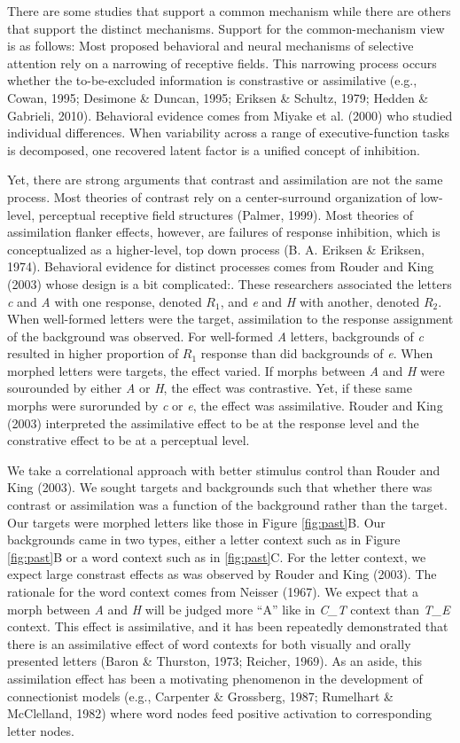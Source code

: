 \documentclass[english,floatsintext,man]{apa6}
\begin{document}
There are some studies that support a common mechanism while there are
others that support the distinct mechanisms. Support for the
common-mechanism view is as follows: Most proposed behavioral and neural
mechanisms of selective attention rely on a narrowing of receptive
fields. This narrowing process occurs whether the to-be-excluded
information is constrastive or assimilative (e.g., Cowan, 1995; Desimone
\& Duncan, 1995; Eriksen \& Schultz, 1979; Hedden \& Gabrieli, 2010).
Behavioral evidence comes from Miyake et al. (2000) who studied
individual differences. When variability across a range of
executive-function tasks is decomposed, one recovered latent factor is a
unified concept of inhibition.

Yet, there are strong arguments that contrast and assimilation are not
the same process. Most theories of contrast rely on a center-surround
organization of low-level, perceptual receptive field structures
(Palmer, 1999). Most theories of assimilation flanker effects, however,
are failures of response inhibition, which is conceptualized as a
higher-level, top down process (B. A. Eriksen \& Eriksen, 1974).
Behavioral evidence for distinct processes comes from Rouder and King
(2003) whose design is a bit complicated:. These researchers associated
the letters \emph{c} and \emph{A} with one response, denoted \(R_1\),
and \emph{e} and \emph{H} with another, denoted \(R_2\). When
well-formed letters were the target, assimilation to the response
assignment of the background was observed. For well-formed \emph{A}
letters, backgrounds of \emph{c} resulted in higher proportion of
\(R_1\) response than did backgrounds of \emph{e}. When morphed letters
were targets, the effect varied. If morphs between \emph{A} and \emph{H}
were sourounded by either \emph{A} or \emph{H}, the effect was
contrastive. Yet, if these same morphs were surorunded by \emph{c} or
\emph{e}, the effect was assimilative. Rouder and King (2003)
interpreted the assimilative effect to be at the response level and the
constrative effect to be at a perceptual level.

We take a correlational approach with better stimulus control than
Rouder and King (2003). We sought targets and backgrounds such that
whether there was contrast or assimilation was a function of the
background rather than the target. Our targets were morphed letters like
those in Figure \ref{fig:past}B. Our backgrounds came in two types,
either a letter context such as in Figure \ref{fig:past}B or a word
context such as in \ref{fig:past}C. For the letter context, we expect
large constrast effects as was observed by Rouder and King (2003). The
rationale for the word context comes from Neisser (1967). We expect that
a morph between \emph{A} and \emph{H} will be judged more \enquote{A}
like in \emph{C\_T} context than \emph{T\_E} context. This effect is
assimilative, and it has been repeatedly demonstrated that there is an
assimilative effect of word contexts for both visually and orally
presented letters (Baron \& Thurston, 1973; Reicher, 1969). As an aside,
this assimilation effect has been a motivating phenomenon in the
development of connectionist models (e.g., Carpenter \& Grossberg, 1987;
Rumelhart \& McClelland, 1982) where word nodes feed positive activation
to corresponding letter nodes.
\end{document}
